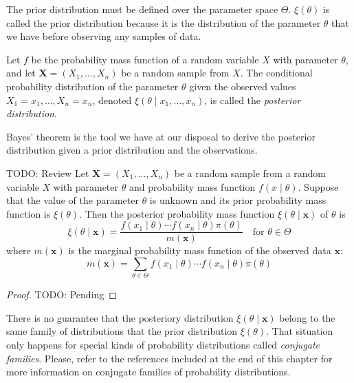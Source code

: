 The prior distribution must be defined over the parameter space $\Theta$. $\xi\left(\theta\right)$ is called the prior distribution because it is the distribution of the parameter $\theta$ that we have before observing any samples of data.

\begin{definition}
Let $f$ be the probability mass function of a random variable $X$ with parameter $\theta$, and let $\mathbf{X}=\left(X_{1},\ldots,X_{n}\right)$ be a random sample from $X$. The conditional probability distribution of the parameter $\theta$ given the observed values $X_1 = x_1, \ldots, X_n = x_n$, denoted $\xi \left( \theta \mid x_1, \ldots, x_n \right)$, is called the \emph{posterior distribution}.
\end{definition}

Bayes' theorem is the tool we have at our disposal to derive the posterior distribution given a prior distribution and the observations.

\begin{proposition}
{\color{red} TODO: Review}
Let $\mathbf{X} = \left( X_{1}, \ldots, X_{n} \right)$ be a random sample from a random variable $X$ with parameter $\theta$ and probability mass function $f\left( x \mid \theta \right)$. Suppose that the value of the parameter $\theta$ is unknown and its prior probability mass function is $\xi\left( \theta \right)$. Then the posterior probability mass function $\xi\left( \theta \mid \mathbf{x} \right)$ of $\theta$ is
\[
\xi\left( \theta \mid \mathbf{x} \right) = \frac{ f\left( x_{1} \mid \theta \right) \cdots f\left( x_{n} \mid \theta \right) \pi\left( \theta \right) }{ m\left( \mathbf{x} \right) } \quad \text{for } \theta \in \Theta
\]
where $m\left( \mathbf{x} \right)$ is the marginal probability mass function of the observed data $\mathbf{x}$:
\[
m\left( \mathbf{x} \right) = \sum_{\theta \in \Theta} f\left( x_{1} \mid \theta \right) \cdots f\left( x_{n} \mid \theta \right) \pi\left( \theta \right)
\]
\end{proposition}
\begin{proof}
{\color{red} TODO: Pending}
\end{proof}

There is no guarantee that the posteriory distribution $\xi\left(\theta\mid\mathbf{x}\right)$ belong to the same family of distributions that the prior distribution $\xi\left(\theta\right)$. That situation only happens for special kinds of probability distributions called \emph{conjugate families}. Please, refer to the references included at the end of this chapter for more information on conjugate families of probability distributions.


